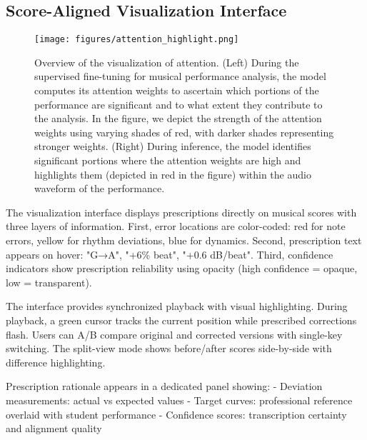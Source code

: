 \subsection{Score-Aligned Visualization Interface}
\begin{figure*}[h]
  \centering
  \texttt{[image: figures/attention\_highlight.png]}
  \caption{Overview of the visualization of attention. (Left) During the supervised fine-tuning for musical performance analysis, the model computes its attention weights to ascertain which portions of the performance are significant and to what extent they contribute to the analysis. 
In the figure, we depict the strength of the attention weights using varying shades of red, with darker shades representing stronger weights. (Right) During inference, the model identifies significant portions where the attention weights are high and highlights them (depicted in red in the figure) within the audio waveform of the performance.}
  \Description{}
  \label{attention_highlight}
\end{figure*}

The visualization interface displays prescriptions directly on musical scores with three layers of information.
First, error locations are color-coded: red for note errors, yellow for rhythm deviations, blue for dynamics.
Second, prescription text appears on hover: "G→A", "+6\% beat", "+0.6 dB/beat".
Third, confidence indicators show prescription reliability using opacity (high confidence = opaque, low = transparent).

The interface provides synchronized playback with visual highlighting.
During playback, a green cursor tracks the current position while prescribed corrections flash.
Users can A/B compare original and corrected versions with single-key switching.
The split-view mode shows before/after scores side-by-side with difference highlighting.

Prescription rationale appears in a dedicated panel showing:
- Deviation measurements: actual vs expected values
- Target curves: professional reference overlaid with student performance  
- Confidence scores: transcription certainty and alignment quality

